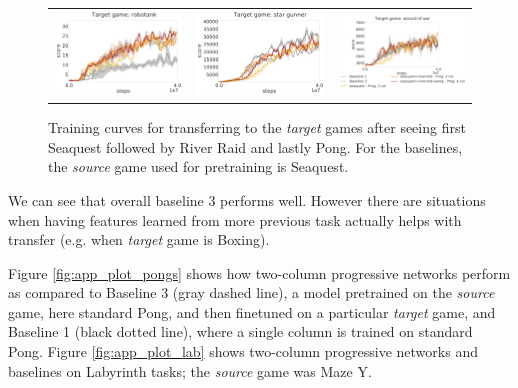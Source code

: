 \begin{figure}
\begin{tabular}{ccc}
        \includegraphics[width=.33\textwidth]{figures/app_plots/mainpaper-nolegend-seaquest_riverraid_pong_to_robotank} &
        \includegraphics[width=.33\textwidth]{figures/app_plots/mainpaper-nolegend-seaquest_riverraid_pong_to_star_gunner} &
        \includegraphics[width=.33\textwidth]{figures/app_plots/mainpaper-legend-seaquest_riverraid_pong_to_wizard_of_wor} \\
    \end{tabular}
    \caption{Training curves for transferring to the \textit{target} games after seeing first Seaquest followed by River Raid and lastly Pong. For the baselines,
    the \textit{source} game used for pretraining is Seaquest.}
    \label{fig:app_plot}
\end{figure}

We can see that overall baseline 3 performs well. However there are situations when having features learned from more previous task actually helps with transfer (e.g. when \textit{target} game is Boxing).

Figure \ref{fig:app_plot_pongs} shows how two-column progressive networks perform as compared to Baseline 3 (gray dashed line), a model pretrained on the \textit{source} game, here standard Pong, and then finetuned on a particular \textit{target} game, and Baseline 1 (black dotted line), where a single column is trained on standard Pong. Figure \ref{fig:app_plot_lab} shows two-column progressive networks and baselines on Labyrinth tasks; the \textit{source} game was Maze Y. 

